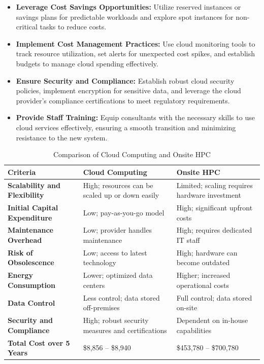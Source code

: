 \documentclass{article}
\begin{document}
\begin{itemize}
    \item \textbf{Leverage Cost Savings Opportunities:} Utilize reserved instances or savings plans for predictable workloads and explore spot instances for non-critical tasks to reduce costs.
    \item \textbf{Implement Cost Management Practices:} Use cloud monitoring tools to track resource utilization, set alerts for unexpected cost spikes, and establish budgets to manage cloud spending effectively.
    \item \textbf{Ensure Security and Compliance:} Establish robust cloud security policies, implement encryption for sensitive data, and leverage the cloud provider's compliance certifications to meet regulatory requirements.
    \item \textbf{Provide Staff Training:} Equip consultants with the necessary skills to use cloud services effectively, ensuring a smooth transition and minimizing resistance to the new system.
\end{itemize}

\begin{table}[H]
    \centering
    \caption{Comparison of Cloud Computing and Onsite HPC}
    \label{tab:advantages_disadvantages}
    \begin{tabular}{p{5cm}p{5cm}p{5cm}}
    \toprule
    \textbf{Criteria} & \textbf{Cloud Computing} & \textbf{Onsite HPC} \\
    \midrule
    \textbf{Scalability and Flexibility} & High; resources can be scaled up or down easily & Limited; scaling requires hardware investment \\
    \textbf{Initial Capital Expenditure} & Low; pay-as-you-go model & High; significant upfront costs \\
    \textbf{Maintenance Overhead} & Low; provider handles maintenance & High; requires dedicated IT staff \\
    \textbf{Risk of Obsolescence} & Low; access to latest technology & High; hardware can become outdated \\
    \textbf{Energy Consumption} & Lower; optimized data centers & Higher; increased operational costs \\
    \textbf{Data Control} & Less control; data stored off-premises & Full control; data stored on-site \\
    \textbf{Security and Compliance} & High; robust security measures and certifications & Dependent on in-house capabilities \\
    \textbf{Total Cost over 5 Years} & \$8,856 -- \$8,940 & \$453,780 -- \$700,780 \\
    \bottomrule
    \end{tabular}
    \end{table}
\end{document}
